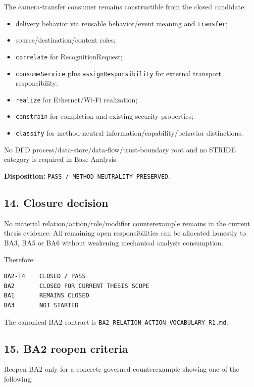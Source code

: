 \documentclass[11pt,a4paper]{article}
\providecommand{\tightlist}{\setlength{\itemsep}{0pt}\setlength{\parskip}{0pt}}
\begin{document}
The camera-transfer consumer remains constructible from the closed candidate:

\begin{itemize}
\tightlist
\item
  delivery behavior via reusable behavior/event meaning and \texttt{transfer};
\item
  source/destination/content roles;
\item
  \texttt{correlate} for RecognitionRequest;
\item
  \texttt{consumeService} plus \texttt{assignResponsibility} for external transport responsibility;
\item
  \texttt{realize} for Ethernet/Wi-Fi realization;
\item
  \texttt{constrain} for completion and existing security properties;
\item
  \texttt{classify} for method-neutral information/capability/behavior distinctions.
\end{itemize}

No DFD process/data-store/data-flow/trust-boundary root and no STRIDE category is required in Base Analysis.

\textbf{Disposition:} \texttt{PASS\ /\ METHOD\ NEUTRALITY\ PRESERVED}.

\subsection{14. Closure decision}\label{closure-decision}

No material relation/action/role/modifier counterexample remains in the current thesis evidence. All remaining open responsibilities can be allocated honestly to BA3, BA5 or BA6 without weakening mechanical analysis consumption.

Therefore:

\begin{verbatim}
BA2-T4    CLOSED / PASS
BA2       CLOSED FOR CURRENT THESIS SCOPE
BA1       REMAINS CLOSED
BA3       NOT STARTED
\end{verbatim}

The canonical BA2 contract is \texttt{BA2\_RELATION\_ACTION\_VOCABULARY\_R1.md}.

\subsection{15. BA2 reopen criteria}\label{ba2-reopen-criteria}

Reopen BA2 only for a concrete governed counterexample showing one of the following:
\end{document}
